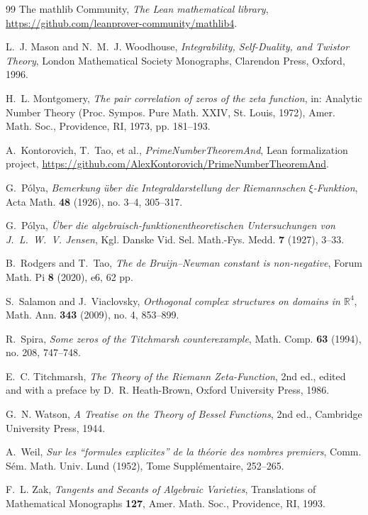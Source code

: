 \documentclass[11pt]{amsart}
\theoremstyle{plain}
\theoremstyle{definition}
\theoremstyle{remark}
\begin{document}
\begin{thebibliography}{99}
The mathlib Community,
\emph{The Lean mathematical library},
\url{https://github.com/leanprover-community/mathlib4}.

L.~J. Mason and N.~M.~J. Woodhouse,
\emph{Integrability, Self-Duality, and Twistor Theory},
London Mathematical Society Monographs, Clarendon Press, Oxford, 1996.

H.~L. Montgomery,
\emph{The pair correlation of zeros of the zeta function},
in: Analytic Number Theory (Proc. Sympos. Pure Math. XXIV, St. Louis, 1972),
Amer. Math. Soc., Providence, RI, 1973, pp. 181--193.

A.~Kontorovich, T.~Tao, et al.,
\emph{PrimeNumberTheoremAnd},
Lean formalization project,
\url{https://github.com/AlexKontorovich/PrimeNumberTheoremAnd}.

G.~P\'olya,
\emph{Bemerkung \"uber die Integraldarstellung der Riemannschen $\xi$-Funktion},
Acta Math. \textbf{48} (1926), no. 3--4, 305--317.

G.~P\'olya,
\emph{\"Uber die algebraisch-funktionentheoretischen Untersuchungen von J.~L.~W.~V. Jensen},
Kgl. Danske Vid. Sel. Math.-Fys. Medd. \textbf{7} (1927), 3--33.

B.~Rodgers and T.~Tao,
\emph{The de Bruijn--Newman constant is non-negative},
Forum Math. Pi \textbf{8} (2020), e6, 62 pp.

S.~Salamon and J.~Viaclovsky,
\emph{Orthogonal complex structures on domains in $\mathbb{R}^4$},
Math. Ann. \textbf{343} (2009), no. 4, 853--899.

R.~Spira,
\emph{Some zeros of the Titchmarsh counterexample},
Math. Comp. \textbf{63} (1994), no. 208, 747--748.

E.~C. Titchmarsh,
\emph{The Theory of the Riemann Zeta-Function}, 2nd ed.,
edited and with a preface by D.~R. Heath-Brown,
Oxford University Press, 1986.

G.~N. Watson,
\emph{A Treatise on the Theory of Bessel Functions}, 2nd ed.,
Cambridge University Press, 1944.

A.~Weil,
\emph{Sur les ``formules explicites'' de la th\'eorie des nombres premiers},
Comm. S\'em. Math. Univ. Lund (1952), Tome Suppl\'ementaire, 252--265.

F.~L. Zak,
\emph{Tangents and Secants of Algebraic Varieties},
Translations of Mathematical Monographs \textbf{127},
Amer. Math. Soc., Providence, RI, 1993.

\end{thebibliography}
\end{document}
